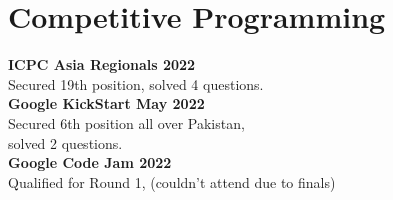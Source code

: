 \documentclass[]{m abbas resume' 2022}
\begin{document}
\begin{minipage}[t]{0.39\textwidth}
\section{Competitive Programming} 
\textbf{ICPC Asia Regionals 2022}\\
Secured 19th position, solved 4 questions. \\ 
\textbf{Google KickStart May 2022}\\
Secured 6th position all over Pakistan,\\ solved 2 questions.\\ 
\textbf{Google Code Jam 2022}\\
Qualified for Round 1, (couldn't attend due to finals) \\ 


\end{minipage} 
\end{document}
